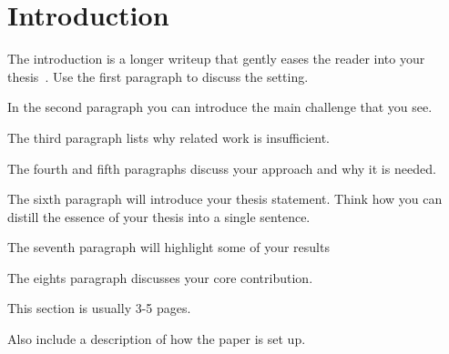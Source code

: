 \chapter{Introduction}


The introduction is a longer writeup that gently eases the reader into your
thesis~\cite{dinesh20oakland}. Use the first paragraph to discuss the setting.

In the second paragraph you can introduce the main challenge that you see.

The third paragraph lists why related work is insufficient.

The fourth and fifth paragraphs discuss your approach and why it is needed.

The sixth paragraph will introduce your thesis statement. Think how you can
distill the essence of your thesis into a single sentence.

The seventh paragraph will highlight some of your results

The eights paragraph discusses your core contribution.

This section is usually 3-5 pages.

Also include a description of how the paper is set up.